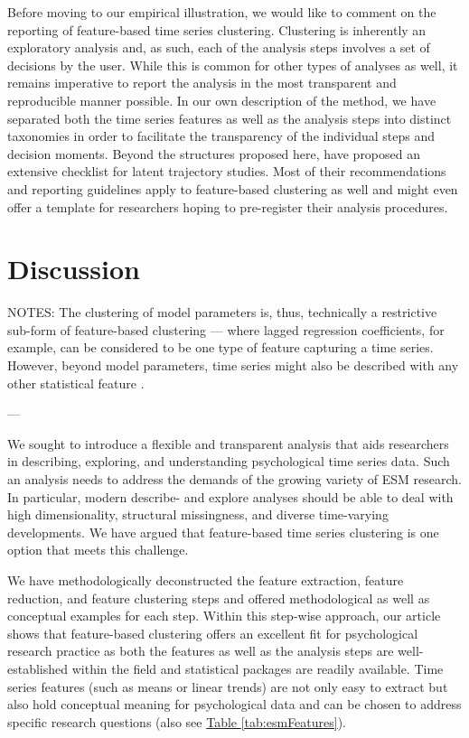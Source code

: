 \documentclass[man, 12pt, a4paper, mask, floatsintext]{apa7}
\theoremstyle{break}
\theoremstyle{plain}
\newcommand{\tblref}[2][]{\hyperref[#2]{Table \ref*{#2}#1}}
\begin{document}
Before moving to our empirical illustration, we would like to comment on the reporting of feature-based time series clustering. Clustering is inherently an exploratory analysis and, as such, each of the analysis steps involves a set of decisions by the user. While this is common for other types of analyses as well, it remains imperative to report the analysis in the most transparent and reproducible manner possible. In our own description of the method, we have separated both the time series features as well as the analysis steps into distinct taxonomies in order to facilitate the transparency of the individual steps and decision moments. Beyond the structures proposed here, \citet{vandeschoot2017} have proposed an extensive checklist for latent trajectory studies. Most of their recommendations and reporting guidelines apply to feature-based clustering as well and might even offer a template for researchers hoping to pre-register their analysis procedures.



\section{Discussion}

NOTES:
The clustering of model parameters is, thus, technically a restrictive sub-form of feature-based clustering --- where lagged regression coefficients, for example, can be considered to be one type of feature capturing a time series. However, beyond model parameters, time series might also be described with any other statistical feature \citep{tiano2021}. 

---

We sought to introduce a flexible and transparent analysis that aids researchers in describing, exploring, and understanding psychological time series data. Such an analysis needs to address the demands of the growing variety of ESM research. In particular, modern describe- and explore analyses should be able to deal with high dimensionality, structural missingness, and diverse time-varying developments. We have argued that feature-based time series clustering is one option that meets this challenge. 

We have methodologically deconstructed the feature extraction, feature reduction, and feature clustering steps and offered methodological as well as conceptual examples for each step. Within this step-wise approach, our article shows that feature-based clustering offers an excellent fit for psychological research practice as both the features as well as the analysis steps are well-established within the field and statistical packages are readily available. Time series features (such as means or linear trends) are not only easy to extract but also hold conceptual meaning for psychological data and can be chosen to address specific research questions (also see \tblref{tab:esmFeatures}). 
\end{document}
